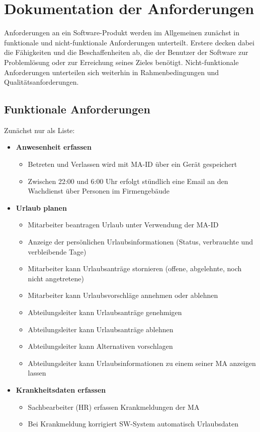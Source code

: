 \chapter{Dokumentation der Anforderungen}
Anforderungen an ein Software-Produkt werden im Allgemeinen zunächst in funktionale und nicht-funktionale Anforderungen unterteilt. Erstere decken dabei die Fähigkeiten und die Beschaffenheiten ab, die der Benutzer der Software zur Problemlösung oder zur Erreichung seines Zieles benötigt. Nicht-funktionale Anforderungen unterteilen sich weiterhin in Rahmenbedingungen und Qualitätsanforderungen.

\section{Funktionale Anforderungen}
Zunächst nur als Liste:
\begin{itemize}
	\item \textbf{Anwesenheit erfassen}
	\begin{itemize}
		\item Betreten und Verlassen wird mit MA-ID \"uber ein Ger\"at gespeichert
		\item Zwischen 22:00 und 6:00 Uhr erfolgt st\"undlich eine Email an den Wachdienst \"uber Personen im Firmengeb\"aude
	\end{itemize}
	
	\item \textbf{Urlaub planen}
	\begin{itemize}
		\item Mitarbeiter beantragen Urlaub unter Verwendung der MA-ID
		\item Anzeige der pers\"onlichen Urlaubsinformationen (Status, verbrauchte und verbleibende Tage)
		\item Mitarbeiter kann Urlaubsantr\"age stornieren (offene, abgelehnte, noch nicht angetretene)
		\item Mitarbeiter kann Urlaubsvorschl\"age annehmen oder ablehnen
		\item Abteilungsleiter kann Urlaubsantr\"age genehmigen
		\item Abteilungsleiter kann Urlaubsantr\"age ablehnen
		\item Abteilungsleiter kann Alternativen vorschlagen
		\item Abteilungsleiter kann Urlaubsinformationen zu einem seiner MA anzeigen lassen
	\end{itemize}
	
	\item \textbf{Krankheitsdaten erfassen}
	\begin{itemize}
		\item	 Sachbearbeiter (HR) erfassen Krankmeldungen der MA
		\item Bei Krankmeldung korrigiert SW-System automatisch Urlaubsdaten
	\end{itemize}
	

\end{itemize}
